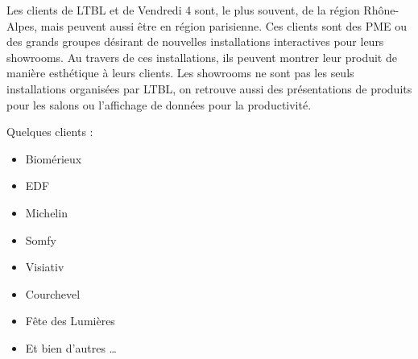 Les clients de LTBL et de Vendredi 4 sont, le plus souvent, de la région Rhône-Alpes, mais peuvent aussi être en région parisienne.
Ces clients sont des PME ou des grands groupes désirant de nouvelles installations interactives pour leurs showrooms.
Au travers de ces installations, ils peuvent montrer leur produit de manière esthétique à leurs clients.
Les showrooms ne sont pas les seuls installations organisées par LTBL, on retrouve aussi des présentations de produits pour les salons ou l'affichage de données pour la productivité.

\bigskip

Quelques clients :

\begin{multicols}{2}
    \begin{itemize}
        \item Biomérieux
        \item EDF
        \item Michelin
        \item Somfy
        \item Visiativ
        \item Courchevel
        \item Fête des Lumières
        \item Et bien d'autres \ldots
    \end{itemize}
\end{multicols}